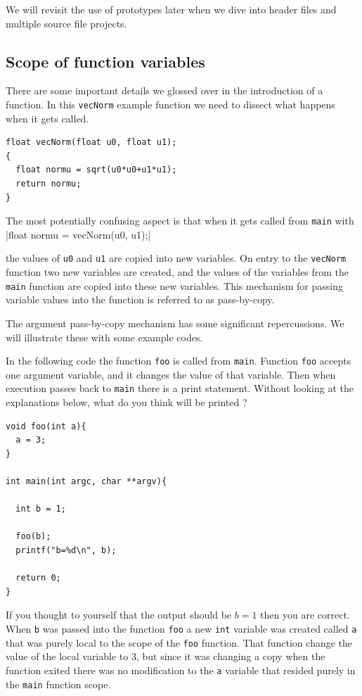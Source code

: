 We will revisit the use of prototypes later when we dive into header files and multiple source file projects.

\subsection{Scope of function variables}

There are some important details we glossed over in the introduction of a function. In this \texttt{vecNorm} example function we need to dissect what happens when it gets called.

\begin{verbatim}
float vecNorm(float u0, float u1);
{
  float normu = sqrt(u0*u0+u1*u1);
  return normu;
}
\end{verbatim}
The most potentially confusing aspect is that when it gets called from \texttt{main} with
|float normu = vecNorm(u0, u1);| 

the values of \texttt{u0} and \texttt{u1} are copied into new variables. On entry to the \texttt{vecNorm} function two new variables are created, and the values of the variables from the \texttt{main} function are copied into these new variables. This mechanism for passing variable values into the function is referred to as pass-by-copy. 

The argument pass-by-copy mechanism has some significant repercussions. We will illustrate these with some example codes.

In the following code the function  \texttt{foo} is called from \texttt{main}. Function \texttt{foo} accepts one argument variable, and it changes the value of that variable. Then when execution passes back to \texttt{main} there is a print statement. Without looking at the explanations below, what do you think will be printed ?

\begin{verbatim}
void foo(int a){
  a = 3;
}

int main(int argc, char **argv){
  
  int b = 1;
  
  foo(b);
  printf("b=%d\n", b);

  return 0;
}
\end{verbatim}

If you thought to yourself that the output should be $b=1$ then you are correct. When \texttt{b} was passed into the function \texttt{foo} a new \texttt{int} variable was created called \texttt{a} that was purely local to the scope of the \texttt{foo} function. That function change the value of the local variable to 3, but since it was changing a copy when the function exited there was no modification to the \texttt{a} variable that resided purely in the \texttt{main} function scope.

